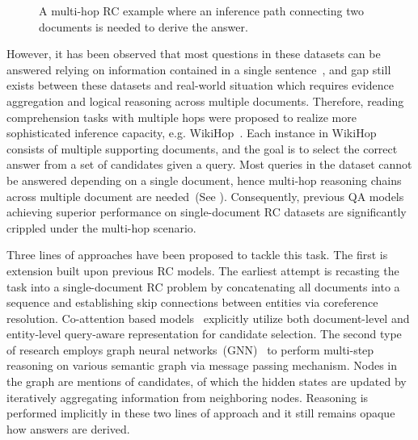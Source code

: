 \begin{figure}[!htb]
	\centering
	\caption{A multi-hop RC example where an inference path connecting two documents is needed to derive the answer.} \label{fig:example}
\end{figure}
However, it has been observed that most questions in these datasets can be answered relying on information contained in a single sentence~\cite{weissenborn-etal-2017-making}, and gap still
exists between these datasets and real-world situation which requires evidence aggregation and logical reasoning across multiple documents. Therefore, reading comprehension tasks with multiple hops were proposed to realize more sophisticated inference capacity, e.g. WikiHop~\cite{Welbl2018}. Each instance in WikiHop consists of multiple supporting documents, and the goal is to select the correct answer from a set of candidates given a query.
Most queries in the dataset cannot be answered depending on a single document, hence multi-hop reasoning chains across multiple document are needed~(See ).
Consequently, previous QA models achieving superior performance on single-document RC datasets are significantly crippled under the multi-hop scenario.

Three lines of approaches have been proposed to tackle this task. The first is extension built upon previous RC models. The earliest attempt \cite{DBLP:journals/corr/abs-1804-05922} is recasting the 
task into a single-document RC problem by concatenating all documents into a sequence and 
establishing skip connections between entities via coreference resolution. 
Co-attention based models~\cite{Zhong2019} explicitly utilize both 
document-level and 
entity-level query-aware representation for candidate selection. 
The second type of research employs graph neural 
networks~(GNN)~\cite{Song2018, Cao2019, Tu2019, BAG} to perform 
multi-step reasoning on various semantic graph via message
passing mechanism. Nodes in the graph are mentions of candidates, 
of which the hidden states are updated by iteratively aggregating 
information from neighboring nodes. 
Reasoning is performed implicitly in these two lines of approach 
and it still remains opaque how answers are derived. 

